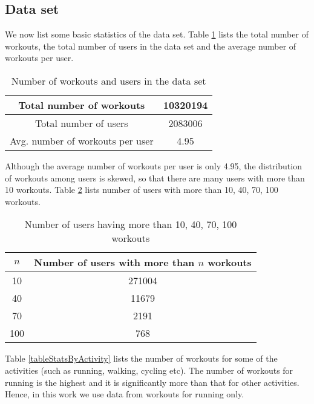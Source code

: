 \documentclass{acm_proc_article-sp}
\begin{document}
\subsection{Data set}

We now list some basic statistics of the data set. Table \ref{tableStatsTotal} lists the total number of workouts, the total number of users in the data set and the average number of workouts per user.

\begin{table}[h]
\centering
\begin{tabular}{|c|c|} \hline
Total number of workouts & 10320194  \\ \hline
Total number of users  &  2083006 \\ \hline
Avg. number of workouts per user & 4.95 \\ \hline
\end{tabular}
\caption{Number of workouts and users in the data set}
\label{tableStatsTotal}
\end{table}

Although the average number of workouts per user is only 4.95, the distribution of workouts among users is skewed, so that there are many users with more than 10 workouts. Table \ref{tableStatsUsers} lists number of users with more than 10, 40, 70, 100 workouts.

\begin{table}[h]
\centering
\begin{tabular}{|c|c|} \hline
\bf{$n$} & \bf{Number of users with more than $n$ workouts}  \\ \hline
10  &  271004        \\ \hline
40  &  11679   \\ \hline
70  &  2191  \\ \hline
100 &  768 \\ \hline
\end{tabular}
\caption{Number of users having more than 10, 40, 70, 100 workouts}
\label{tableStatsUsers}
\end{table}

Table \ref{tableStatsByActivity} lists the number of workouts for some of the activities (such as running, walking, cycling etc). The number of workouts for running is the highest and it is significantly more than that for other activities. Hence, in this work we use data from workouts for running only.
\end{document}
